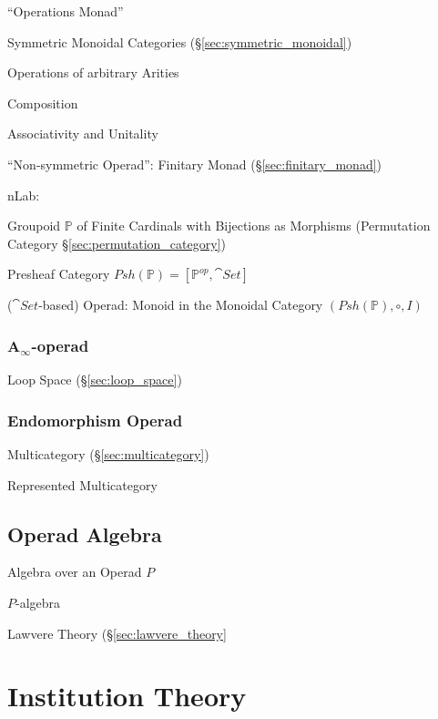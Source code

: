 ``Operations Monad''

Symmetric Monoidal Categories
(\S\ref{sec:symmetric_monoidal})

Operations of arbitrary Arities

Composition

Associativity and Unitality

``Non-symmetric Operad'': Finitary Monad (\S\ref{sec:finitary_monad})

nLab:

Groupoid $\mathbb{P}$ of Finite Cardinals with Bijections as Morphisms
(Permutation Category \S\ref{sec:permutation_category})

Presheaf Category $Psh(\mathbb{P}) = [\mathbb{P}^{op}, \cat{Set}]$

($\cat{Set}$-based) Operad: Monoid in the Monoidal Category
$(Psh(\mathbb{P}), \circ, I)$ %



\subsubsection{A$_\infty$-operad}\label{sec:a_infinity_operad}

Loop Space (\S\ref{sec:loop_space})



\subsubsection{Endomorphism Operad}\label{sec:endomorphism_operad}

Multicategory (\S\ref{sec:multicategory})

Represented Multicategory



\subsection{Operad Algebra}\label{sec:operad_algebra}

Algebra over an Operad $P$

$P$-algebra

Lawvere Theory (\S\ref{sec:lawvere_theory}



\section{Institution Theory}\label{sec:institution_theory}


